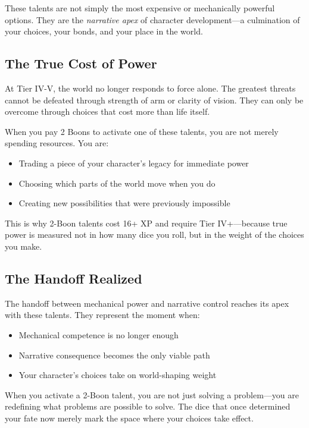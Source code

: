 \documentclass[11pt]{book}
\begin{document}
These talents are not simply the most expensive or mechanically powerful options. They are the \emph{narrative apex} of character development---a culmination of your choices, your bonds, and your place in the world.

\subsection*{The True Cost of Power}

At Tier IV-V, the world no longer responds to force alone. The greatest threats cannot be defeated through strength of arm or clarity of vision. They can only be overcome through choices that cost more than life itself.

When you pay 2 Boons to activate one of these talents, you are not merely spending resources. You are:

\begin{itemize}
  \item Trading a piece of your character's legacy for immediate power
  \item Choosing which parts of the world move when you do
  \item Creating new possibilities that were previously impossible
\end{itemize}

This is why 2-Boon talents cost 16+ XP and require Tier IV+---because true power is measured not in how many dice you roll, but in the weight of the choices you make.

\subsection{The Handoff Realized}

The handoff between mechanical power and narrative control reaches its apex with these talents. They represent the moment when:

\begin{itemize}
  \item Mechanical competence is no longer enough
  \item Narrative consequence becomes the only viable path
  \item Your character's choices take on world-shaping weight
\end{itemize}

When you activate a 2-Boon talent, you are not just solving a problem---you are redefining what problems are possible to solve. The dice that once determined your fate now merely mark the space where your choices take effect.
\end{document}
